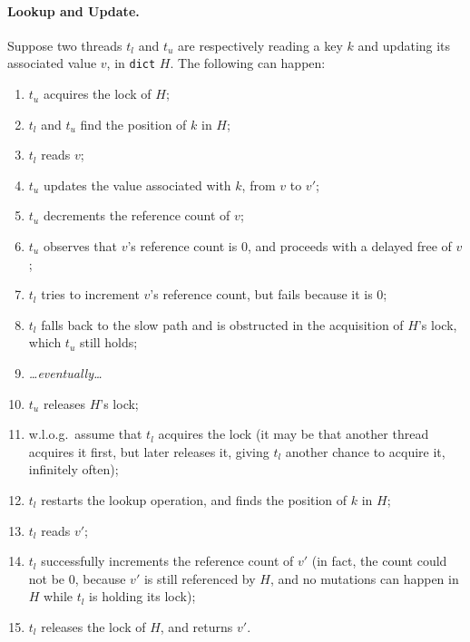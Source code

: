 \paragraph{Lookup and Update.}
Suppose two threads $t_l$ and $t_u$ are respectively reading a key $k$ and updating its associated value $v$, in \texttt{dict} $H$.
The following can happen:
\begin{enumerate}
	\item $t_u$ acquires the lock of $H$;
	\item $t_l$ and $t_u$ find the position of $k$ in $H$;
	\item $t_l$ reads $v$;
	\item $t_u$ updates the value associated with $k$, from $v$ to $v'$;
	\item $t_u$ decrements the reference count of $v$;
	\item $t_u$ observes that $v$'s reference count is 0, and proceeds with a delayed free of $v$;
	\item $t_l$ tries to increment $v$'s reference count, but fails because it is 0;
	\item $t_l$ falls back to the slow path and is obstructed in the acquisition of $H$'s lock, which $t_u$ still holds;
	\item \emph{{\ldots}eventually{\ldots}}
	\item $t_u$ releases $H$'s lock;
	\item w.l.o.g.\ assume that $t_l$ acquires the lock (it may be that another thread acquires it first, but later releases it, giving $t_l$ another chance to acquire it, infinitely often);
	\item $t_l$ restarts the lookup operation, and finds the position of $k$ in $H$;
	\item $t_l$ reads $v'$;
	\item $t_l$ successfully increments the reference count of $v'$ (in fact, the count could not be 0, because $v'$ is still referenced by $H$, and no mutations can happen in $H$ while $t_l$ is holding its lock);
	\item $t_l$ releases the lock of $H$, and returns $v'$.
\end{enumerate}

